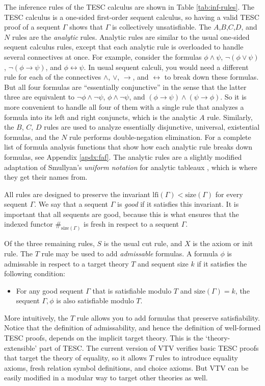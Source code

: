 \documentclass{lipics-v2021}
\newcommand{\idf}[1]{\#_{#1}}
\newcommand{\lfi}[0]{\mathrm{lfi}}
\newcommand{\limp}[0]{\to}
\newcommand{\liff}[0]{\leftrightarrow}
\newcommand{\size}[0]{\mathrm{size}}
\begin{document}


The inference rules of the TESC calculus are shown in Table \ref{tab:inf-rules}.
The TESC calculus is a one-sided first-order sequent calculus, so having 
a valid TESC proof of a sequent $\Gamma$ shows that $\Gamma$ is collectively unsatisfiable.
The $A$,$B$,$C$,$D$, and $N$ rules are the \textit{analytic} rules. 
Analytic rules are similar to the usual one-sided sequent calculus rules, 
except that each analytic rule is overloaded to handle several connectives at once. 
For example, consider the formulas $\phi \land \psi$, $\lnot (\phi \lor \psi)$, 
$\lnot (\phi \limp \psi)$, and $\phi \liff \psi$. In usual sequent calculi, you would 
need a different rule for each of the connectives $\land$, $\lor$, $\limp$, and $\liff$ to 
break down these formulas. But all four formulas are ``essentially conjunctive'' 
in the sense that the latter three are equivalent to $\lnot \phi \land \lnot \psi$, 
$\phi \land \lnot \psi$, and $(\phi \limp \psi) \land (\psi \limp \phi)$.
So it is more convenient to handle all four of them with a single rule that analyzes 
a formula into its left and right conjuncts, which is the analytic $A$ rule.
Similarly, the $B$, $C$, $D$ rules are used to analyze essentially disjunctive, 
universal, existential formulas, and the $N$ rule performs double-negation elimination. 
For a complete list of formula analysis functions that show how each analytic 
rule breaks down formulas, see Appendix \ref{apdx:faf}. The analytic rules are 
a slightly modified adaptation of Smullyan's \textit{uniform notation} for analytic 
tableaux \cite{smullyan1995first}, which is where they get their names from. 

All rules are designed to preserve the invariant $\lfi(\Gamma) < \size(\Gamma)$ 
for every sequent $\Gamma$. We say that a sequent $\Gamma$ is \textit{good} if it satisfies 
this invariant. It is important that all sequents are good, because this is what ensures 
that the indexed functor $\idf{\size(\Gamma)}$ is fresh in respect to a sequent $\Gamma$.

Of the three remaining rules, $S$ is the usual cut rule, and $X$ is the axiom or init rule. 
The $T$ rule may be used to add \textit{admissable} formulas. A formula $\phi$ is admissable 
in respect to a target theory $T$ and sequent size $k$ if it satisfies the following condition:  
\begin{itemize}
  \item For any good sequent $\Gamma$ that is satisfiable modulo $T$ and $\size(\Gamma) = k$, the 
sequent $\Gamma, \phi$ is also satisfiable modulo $T$. 
\end{itemize}
More intuitively, the $T$ rule allows you to add formulas that preserve satisfiability. 
Notice that the definition of admissability, and hence the definition of well-formed 
TESC proofs, depends on the implicit target theory. This is the `theory-extensible' part of TESC. 
The current version of VTV verifies basic TESC proofs that target the theory of equality, so it allows $T$ 
rules to introduce equality axioms, fresh relation symbol definitions, and choice axioms.
But VTV can be easily modified in a modular way to target other theories as well.
\end{document}
